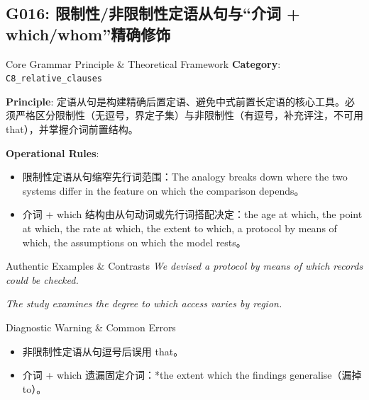 \subsection{G016: 限制性/非限制性定语从句与“介词 + which/whom”精确修饰}\label{sec:rule:G016}
\begin{ConceptBox}{Core Grammar Principle \& Theoretical Framework}
\textbf{Category}: \texttt{C8\_relative\_clauses}\par\vspace{3pt}
\textbf{Principle}: 定语从句是构建精确后置定语、避免中式前置长定语的核心工具。必须严格区分限制性（无逗号，界定子集）与非限制性（有逗号，补充评注，不可用 that），并掌握介词前置结构。\par\vspace{4pt}
\textbf{Operational Rules}:
\begin{itemize}[leftmargin=1.5em, itemsep=1pt]
  \item 限制性定语从句缩窄先行词范围：The analogy breaks down where the two systems differ in the feature on which the comparison depends。
  \item 介词 + which 结构由从句动词或先行词搭配决定：the age at which, the point at which, the rate at which, the extent to which, a protocol by means of which, the assumptions on which the model rests。
\end{itemize}
\end{ConceptBox}
\begin{ExampleBox}{Authentic Examples \& Contrasts}
\textit{We devised a protocol by means of which records could be checked.}\par\vspace{2pt}
\textit{The study examines the degree to which access varies by region.}\par\vspace{2pt}
\end{ExampleBox}
\begin{TipBox}{Diagnostic Warning \& Common Errors}
\begin{itemize}[leftmargin=1.5em, itemsep=1pt]
  \item 非限制性定语从句逗号后误用 that。
  \item 介词 + which 遗漏固定介词：*the extent which the findings generalise（漏掉 to）。
\end{itemize}
\end{TipBox}
\vspace{6pt}
